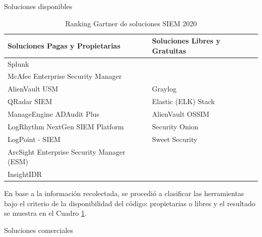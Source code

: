 \begin{section}{Soluciones disponibles}
        
         \begin{table}[h]
        \begin{tabular}{ | m{22em}| m{17em} | } 
            \hline
            Soluciones Pagas y Propietarias & Soluciones Libres y Gratuitas  \\ 
            \hline
            Splunk\cite{splunk} &  \\ 
            
            McAfee Enterprise Security Manager\cite{enterprise} &  \\
            
            AlienVault USM\cite{alienvault_usm} & Graylog\cite{graylog} \\ 
             
            QRadar SIEM \cite{qradar} & Elastic (ELK) Stack\cite{elastic}  \\
             
            ManageEngine ADAudit Plus\cite{adaudit} & AlienVault OSSIM\cite{alienvault_ossim}  \\
             
            LogRhythm NextGen SIEM Platform\cite{logrhythm} & Security Onion\cite{sonion}  \\
             
            LogPoint - SIEM\cite{logpoint} & Sweet Security\cite{sweet_security}  \\
             
            ArcSight Enterprise Security Manager (ESM)\cite{arcsight} &   \\
             
            InsightIDR\cite{insight} &   \\
             
            \hline %
        \end{tabular}
        \caption{Ranking Gartner \cite{ranking} de soluciones SIEM 2020}
        \label{table:3}
    \end{table}
    \FloatBarrier
    En base a la información recolectada, se procedió a clasificar las herramientas bajo el criterio de la disponibilidad del código: propietarias o libres y el resultado se muestra en el Cuadro \ref{table:3}.
    \begin{subsection}{Soluciones comerciales}
    

\end{subsection}
\end{section}

